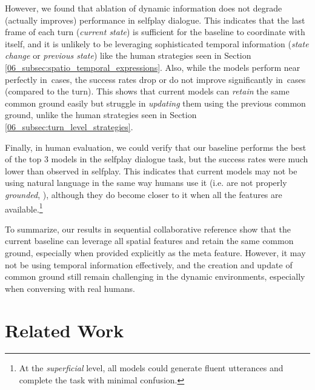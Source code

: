 However, we found that ablation of dynamic information does not degrade (actually improves) performance in selfplay dialogue. This indicates that the last frame of each turn (\textit{current state}) is sufficient for the baseline to coordinate with itself, and it is unlikely to be leveraging sophisticated temporal information (\textit{state change} or \textit{previous state}) like the human strategies seen in Section \ref{06_subsec:spatio_temporal_expressions}. Also, while the models perform near perfectly in \cmark\,cases, the success rates drop or do not improve significantly in \xmark\,cases (compared to the  turn). This shows that current models can \textit{retain} the same common ground easily but struggle in \textit{updating} them using the previous common ground, unlike the human strategies seen in Section \ref{06_subsec:turn_level_strategies}.

Finally, in human evaluation, we could verify that our baseline performs the best of the top 3 models in the selfplay dialogue task, but the success rates were much lower than observed in selfplay. This indicates that current models may not be using natural language in the same way humans use it (i.e. are not properly \textit{grounded}, \citealp{bender-koller-2020-climbing}), although they do become closer to it when all the features are available.\footnote{At the \textit{superficial} level, all models could generate fluent utterances and complete the task with minimal confusion.}

To summarize, our results in sequential collaborative reference show that the current baseline can leverage all spatial features and retain the same common ground, especially when provided explicitly as the meta feature. However, it may not be using temporal information effectively, and the creation and update of common ground still remain challenging in the dynamic environments, especially when conversing with real humans.

\section{Related Work}
\label{06_sec:related_work}


